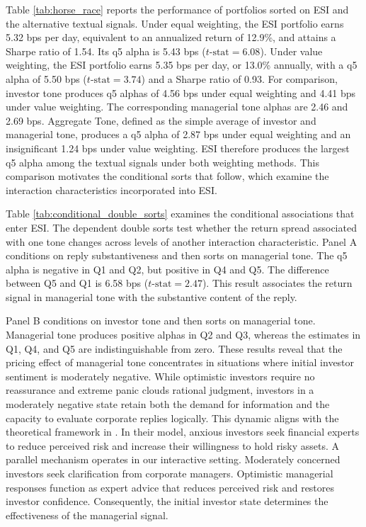 \documentclass[12pt]{article}
\begin{document}
Table \ref{tab:horse_race} reports the performance of portfolios sorted on ESI and the alternative textual signals. Under equal weighting, the ESI portfolio earns 5.32 bps per day, equivalent to an annualized return of 12.9\%, and attains a Sharpe ratio of 1.54. Its q5 alpha is 5.43 bps ($t\text{-stat} = 6.08$). Under value weighting, the ESI portfolio earns 5.35 bps per day, or 13.0\% annually, with a q5 alpha of 5.50 bps ($t\text{-stat} = 3.74$) and a Sharpe ratio of 0.93. For comparison, investor tone produces q5 alphas of 4.56 bps under equal weighting and 4.41 bps under value weighting. The corresponding managerial tone alphas are 2.46 and 2.69 bps. Aggregate Tone, defined as the simple average of investor and managerial tone, produces a q5 alpha of 2.87 bps under equal weighting and an insignificant 1.24 bps under value weighting. ESI therefore produces the largest q5 alpha among the textual signals under both weighting methods. This comparison motivates the conditional sorts that follow, which examine the interaction characteristics incorporated into ESI.

Table \ref{tab:conditional_double_sorts} examines the conditional associations that enter ESI. The dependent double sorts test whether the return spread associated with one tone changes across levels of another interaction characteristic. Panel A conditions on reply substantiveness and then sorts on managerial tone. The q5 alpha is negative in Q1 and Q2, but positive in Q4 and Q5. The difference between Q5 and Q1 is 6.58 bps ($t\text{-stat} = 2.47$). This result associates the return signal in managerial tone with the substantive content of the reply.

Panel B conditions on investor tone and then sorts on managerial tone. Managerial tone produces positive alphas in Q2 and Q3, whereas the estimates in Q1, Q4, and Q5 are indistinguishable from zero. These results reveal that the pricing effect of managerial tone concentrates in situations where initial investor sentiment is moderately negative. While optimistic investors require no reassurance and extreme panic clouds rational judgment, investors in a moderately negative state retain both the demand for information and the capacity to evaluate corporate replies logically. This dynamic aligns with the theoretical framework in \citet{gennaioli2015}. In their model, anxious investors seek financial experts to reduce perceived risk and increase their willingness to hold risky assets. A parallel mechanism operates in our interactive setting. Moderately concerned investors seek clarification from corporate managers. Optimistic managerial responses function as expert advice that reduces perceived risk and restores investor confidence. Consequently, the initial investor state determines the effectiveness of the managerial signal.
\end{document}
